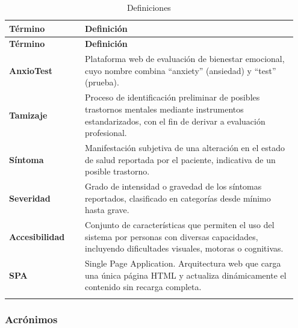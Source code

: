 \begin{longtable}{p{0.25\linewidth} p{0.70\linewidth}}
\toprule
\rowcolor{tableheader!20}
\textbf{Término} & \textbf{Definición} \\
\midrule
\endfirsthead
\rowcolor{tableheader!20}
\textbf{Término} & \textbf{Definición} \\
\midrule
\endhead
\bottomrule
\endfoot
\textbf{AnxioTest} & Plataforma web de evaluación de bienestar emocional, cuyo nombre combina ``anxiety'' (ansiedad) y ``test'' (prueba). \\
\textbf{Tamizaje} & Proceso de identificación preliminar de posibles trastornos mentales mediante instrumentos estandarizados, con el fin de derivar a evaluación profesional. \\
\textbf{Síntoma} & Manifestación subjetiva de una alteración en el estado de salud reportada por el paciente, indicativa de un posible trastorno. \\
\textbf{Severidad} & Grado de intensidad o gravedad de los síntomas reportados, clasificado en categorías desde mínimo hasta grave. \\
\textbf{Accesibilidad} & Conjunto de características que permiten el uso del sistema por personas con diversas capacidades, incluyendo dificultades visuales, motoras o cognitivas. \\
\textbf{SPA} & Single Page Application. Arquitectura web que carga una única página HTML y actualiza dinámicamente el contenido sin recarga completa. \\
\bottomrule
\caption{Definiciones}
\label{tab:definiciones}
\end{longtable}

\subsubsection{Acrónimos}

